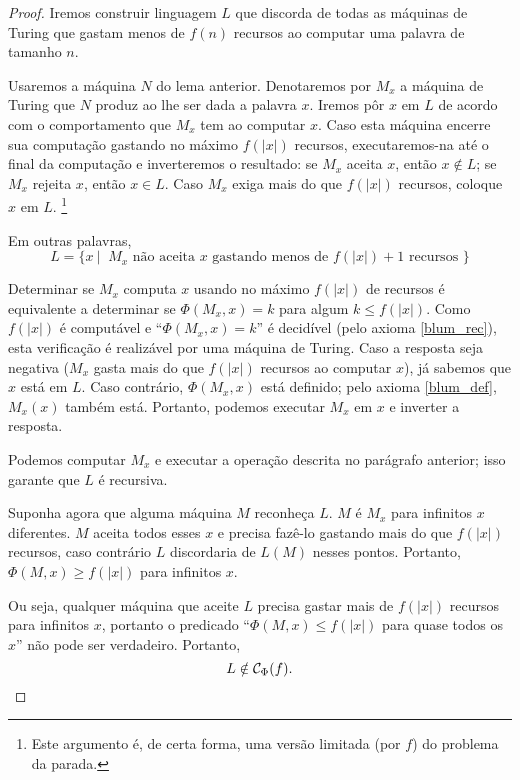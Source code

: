 \begin{proof}
    Iremos construir linguagem $L$
    que discorda de todas as máquinas de Turing que gastam menos de
    $f(n)$ recursos ao computar uma palavra de tamanho $n$.

    Usaremos a máquina $N$ do lema anterior.
    Denotaremos por $M_x$
    a máquina de Turing que $N$ produz
    ao lhe ser dada a palavra $x$.
    Iremos pôr $x$ em $L$
    de acordo com o comportamento que $M_x$ tem ao computar $x$.
    Caso esta máquina encerre sua computação
    gastando no máximo $f(|x|)$ recursos,
    executaremos-na até o final da computação
    e inverteremos o resultado:
    se $M_x$ aceita $x$, então $x \notin L$;
    se $M_x$ rejeita $x$, então $x \in L$.
    Caso $M_x$ exiga mais do que $f(|x|)$ recursos,
    coloque $x$ em $L$.
    \footnote{
        Este argumento é,
        de certa forma,
        uma versão limitada
        (por $f$)
        do problema da parada.
    }

    Em outras palavras,
    \begin{equation*}
        L = \{ x \ | \ \text{
            $M_x$ não aceita $x$ gastando menos de $f(|x|)+1$ recursos
        } \}
    \end{equation*}

    Determinar se $M_x$ computa $x$ usando no máximo $f(|x|)$ de recursos
    é equivalente a determinar se $\Phi(M_x, x) = k$
    para algum $k \leq f(|x|)$.
    Como $f(|x|)$ é computável
    e ``$\Phi(M_x, x) = k$'' é decidível
    (pelo axioma \ref{blum_rec}),
    esta verificação é realizável por uma máquina de Turing.
    Caso a resposta seja negativa
    ($M_x$ gasta mais do que $f(|x|)$ recursos ao computar $x$),
    já sabemos que $x$ está em $L$.
    Caso contrário,
    $\Phi(M_x, x)$ está definido;
    pelo axioma \ref{blum_def},
    $M_x(x)$ também está.
    Portanto, podemos executar $M_x$ em $x$
    e inverter a resposta.

    Podemos computar $M_x$ e executar a operação descrita no parágrafo anterior;
    isso garante que $L$ é recursiva.

    Suponha agora que alguma máquina $M$ reconheça $L$.
    $M$ é $M_x$ para infinitos $x$ diferentes.
    $M$ aceita todos esses $x$
    e precisa fazê-lo gastando mais do que $f(|x|)$ recursos,
    caso contrário $L$ discordaria de $L(M)$ nesses pontos.
    Portanto, $\Phi(M, x) \geq f(|x|)$ para infinitos $x$.

    Ou seja, qualquer máquina que aceite $L$
    precisa gastar mais de $f(|x|)$ recursos para infinitos $x$,
    portanto o predicado ``$\Phi(M, x) \leq f(|x|)$ para quase todos os $x$''
    não pode ser verdadeiro.
    Portanto,
    \begin{equation*}
        L \notin \mathcal C_\Phi(f). \qedhere
    \end{equation*}
\end{proof}

